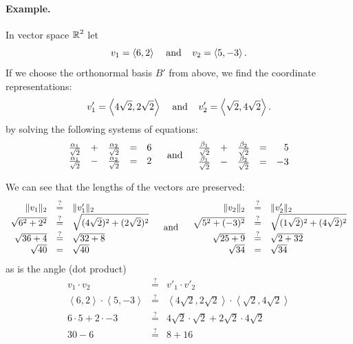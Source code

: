 \paragraph{Example.}
In vector space $\operatorname{\mathbb{R}}^2$ let \[v_1 = \left\langle6,2\right\rangle\;\;\;\;\textnormal{and}\;\;\;\; v_2 = \left\langle5,-3\right\rangle.\]
If we choose the orthonormal basis  $B'$ from above, 
we find the coordinate representations:
\[
v'_1 = \left\langle4\sqrt{2},2\sqrt{2}\right\rangle \;\;\;\;\textnormal{and}\;\;\;\; v'_2 = \left\langle\sqrt{2},4\sqrt{2}\right\rangle.
\]
by solving the following systems of equations: 
\[
\begin{array}{rcrcr}
\frac{\alpha_1}{\sqrt{2}} &+& \frac{\alpha_2}{\sqrt{2}} &=& 6\\
\frac{\alpha_1}{\sqrt{2}} &-& \frac{\alpha_2}{\sqrt{2}} &=& 2\\ 
\end{array} \;\;\;\;\textnormal{and}\;\;\;\; \begin{array}{rcrcr}
\frac{\beta_1}{\sqrt{2}} &+& \frac{\beta_2}{\sqrt{2}} &=& 5\\
\frac{\beta_1}{\sqrt{2}} &-& \frac{\beta_2}{\sqrt{2}} &=& -3\\ 
\end{array}\]

We can see that the lengths of the vectors are preserved: 
\[
\begin{array}{rcl}
\|v_1\|_2 & \stackrel{?}{=} & \|v'_1\|_2\\
\sqrt{6^2+2^2} & \stackrel{?}{=} & \sqrt{(4\sqrt{2})^2+(2\sqrt{2})^2}\\
\sqrt{36+4} & \stackrel{?}{=} & \sqrt{32 + 8}\\
\sqrt{40} & = & \sqrt{40}\\
\end{array}\;\;\;\;\textnormal{and}\;\;\;\; 
\begin{array}{rcl}
\|v_2\|_2 & \stackrel{?}{=} & \|v'_2\|_2\\
\sqrt{5^2+(-3)^2} & \stackrel{?}{=} & \sqrt{(1\sqrt{2})^2+(4\sqrt{2})^2}\\
\sqrt{25+9} & \stackrel{?}{=} & \sqrt{2 + 32}\\
\sqrt{34} & = & \sqrt{34}\\
\end{array} 
\]
as is the angle (dot product)
\[\begin{array}{rcl}
v_1 \cdot v_2 & \stackrel{?}{=} & v'_1 \cdot v'_2 \\
\left\langle6,2\right\rangle\cdot \left\langle5,-3\right\rangle&  \stackrel{?}{=}  & \left\langle4\sqrt{2},2\sqrt{2}\right\rangle\cdot\left\langle\sqrt{2},4\sqrt{2}\right\rangle\\
6\cdot5+2\cdot-3&  \stackrel{?}{=}  & 4\sqrt{2}\cdot\sqrt{2}+2\sqrt{2}\cdot4\sqrt{2}\\
30-6 &  \stackrel{?}{=}  & 8 + 16\\
\end{array} 
\]

